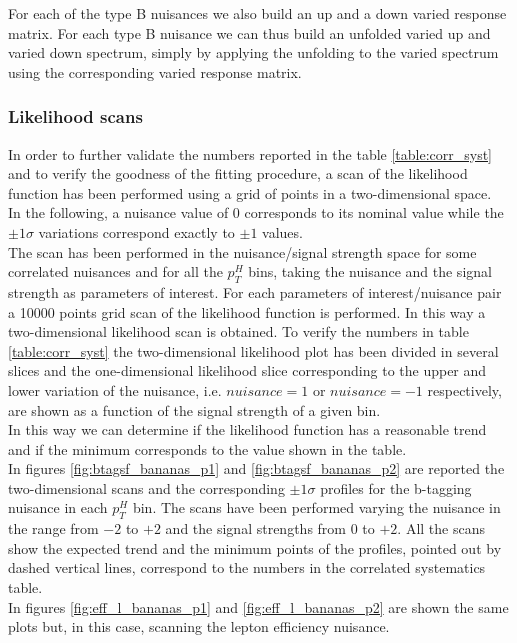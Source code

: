 
For each of the type B nuisances we also build an up and a down varied response matrix.
For each type B nuisance we can thus build an unfolded varied up and varied down spectrum, simply by applying the unfolding to the varied spectrum using the corresponding varied response matrix.


\subsubsection{Likelihood scans}\label{subsec:bananas}
In order to further validate the numbers reported in the table \ref{table:corr_syst} and to verify the goodness of the fitting procedure, a scan of the likelihood function has been performed using a grid of points in a two-dimensional space. \\
In the following, a nuisance value of 0 corresponds to its nominal value while the $\pm 1 \sigma$ variations correspond exactly to $\pm 1$ values.\\
The scan has been performed in the nuisance/signal strength space for some correlated nuisances and for all the $p_T^H$ bins, taking the nuisance and the signal strength as parameters of interest. For each parameters of interest/nuisance pair a 10000 points grid scan of the likelihood function is performed. In this way a two-dimensional likelihood scan is obtained. To verify the numbers in table \ref{table:corr_syst} the two-dimensional likelihood plot has been divided in several slices and the one-dimensional likelihood slice corresponding to the upper and lower variation of the nuisance, i.e. $nuisance=1$ or $nuisance=-1$ respectively, are shown as a function of the signal strength of a given bin.\\ In this way we can determine if the likelihood function has a reasonable trend and if the minimum corresponds to the value shown in the table.\\
In figures \ref{fig:btagsf_bananas_p1} and \ref{fig:btagsf_bananas_p2} are reported the two-dimensional scans and the corresponding $\pm 1 \sigma$ profiles for the b-tagging nuisance in each $p_T^H$ bin. The scans have been performed varying the nuisance in the range from $-2$ to $+2$ and the signal strengths from $0$ to $+2$.
 All the scans show the expected trend and the minimum points of the profiles, pointed out by dashed vertical lines, correspond to the numbers in the correlated systematics table.\\
 In figures \ref{fig:eff_l_bananas_p1} and \ref{fig:eff_l_bananas_p2} are shown the same plots but, in this case, scanning the lepton efficiency nuisance.

